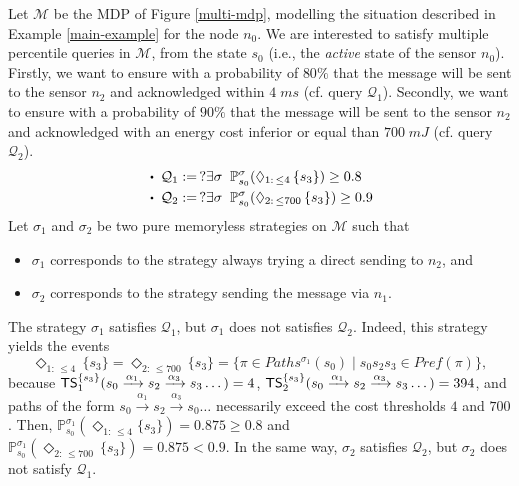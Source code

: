 \begin{example}
  Let $\mathcal{M}$ be the MDP of Figure \ref{multi-mdp}, modelling the situation described in Example \ref{main-example} for the node $n_0$.
  We are interested to satisfy multiple percentile queries in $\mathcal{M}$, from the state $s_0$ (i.e., the \textit{active} state of the sensor $n_0$).
  Firstly, we want to ensure with a probability of $80 \%$ that the message will be sent to the sensor $n_2$ and acknowledged within $4 \; ms$ (cf. query $\mathcal{Q}_1$). Secondly, we want to ensure with a probability of $90 \%$ that the message will be sent to the sensor $n_2$ and acknowledged with an energy cost inferior or equal than $700 \; mJ$ (cf. query $\mathcal{Q}_2$).
  \begin{align*}
    &\bigcdot\;\mathcal{Q}_1 := \,  ?\exists \sigma \;\; \mathbb{P}^{\sigma}_{s_0}(\Diamond_{1: \, \leq 4} \, \{s_3\}) \geq 0.8 \\
    &\bigcdot\;\mathcal{Q}_2 := \, ? \exists \sigma \;\; \mathbb{P}_{s_0}^{\sigma}(\Diamond_{2: \, \leq 700} \, \{s_3\}) \geq 0.9
  \end{align*}
  Let $\sigma_1$ and $\sigma_2$ be two pure memoryless strategies on $\mathcal{M}$ such that
  \begin{itemize}
    \item $\sigma_1$ corresponds to the strategy always trying a direct sending to $n_2$, and
    \item $\sigma_2$ corresponds to the strategy sending the message via $n_1$.
  \end{itemize}
  The strategy $\sigma_1$ satisfies $\mathcal{Q}_1$, but $\sigma_1$ does not satisfies $\mathcal{Q}_2$.
  Indeed, this strategy yields %
  the events
  \[\Diamond_{1:\, \leq 4}\, \{s_3\} = \Diamond_{2:\, \leq 700}\, \{s_3\} = \{ \pi \in Paths^{\sigma_1}(s_0) \; | \; s_0 %
  s_2 %
  s_3 %
  \in Pref(\pi) \},\]
  because $\text{\sffamily TS}^{\{s_3\}}_1 (s_0 \xrightarrow{\alpha_1}s_2 \xrightarrow{\alpha_3}s_3 \dots) = 4 $,
  $\text{\sffamily TS}^{\{s_3\}}_2 (s_0 \xrightarrow{\alpha_1}s_2 \xrightarrow{\alpha_3}s_3 \dots) = 394 $, and
  paths of the form $s_0 \xrightarrow{\alpha_1}s_2 \xrightarrow{\alpha_3}s_0 \dots$ necessarily exceed the cost thresholds $4$ and $700$.
  Then, $\mathbb{P}_{s_0}^{\sigma_1}(\Diamond_{1:\, \leq 4}\{s_3\}) = 0.875 \geq 0.8$ and $\mathbb{P}_{s_0}^{\sigma_1}(\Diamond_{2: \, \leq 700} \, \{s_3\}) = 0.875<0.9$.
  In the same way, $\sigma_2$ satisfies $\mathcal{Q}_2$, but $\sigma_2$ does not satisfy $\mathcal{Q}_1$.

\end{example}
